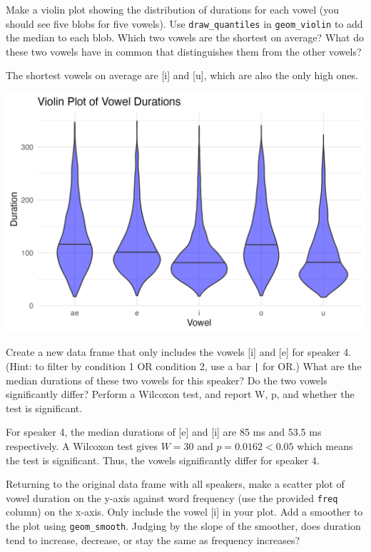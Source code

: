 \documentclass{../../templates/lkx_pset}
\begin{document}
\begin{problem}{2}
Make a violin plot showing the distribution of durations for each vowel (you should see five blobs for five vowels). Use \texttt{draw\_quantiles} in \texttt{geom\_violin} to add the median to each blob. Which two vowels are the shortest on average? What do these two vowels have in common that distinguishes them from the other vowels?
\end{problem}

The shortest vowels on average are [i] and [u], which are also the only high ones.

\begin{center}
\includegraphics[]{problem2.png}
\end{center}

\begin{problem}{3}
Create a new data frame that only includes the vowels [i] and [e] for speaker 4. (Hint: to filter by condition 1 OR condition 2, use a bar \texttt{|} for OR.) What are the median durations of these two vowels for this speaker? Do the two vowels significantly differ? Perform a Wilcoxon test, and report W, p, and whether the test is significant.
\end{problem}

For speaker 4, the median durations of [e] and [i] are 85 ms and 53.5 ms respectively. A Wilcoxon test gives $W=30$ and $p=0.0162 < 0.05$ which means the test is significant. Thus, the vowels significantly differ for speaker 4.

\begin{problem}{4}
Returning to the original data frame with all speakers, make a scatter plot of vowel duration on the y-axis against word frequency (use the provided \texttt{freq} column) on the x-axis. Only include the vowel [i] in your plot. Add a smoother to the plot using \texttt{geom\_smooth}. Judging by the slope of the smoother, does duration tend to increase, decrease, or stay the same as frequency increases?
\end{problem}
\end{document}
